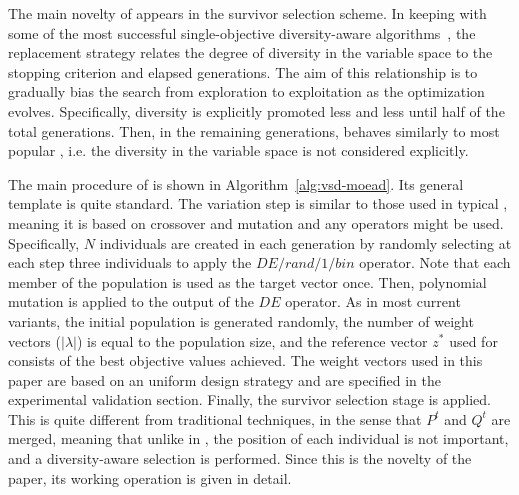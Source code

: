 The main novelty of \AVSDMOEAD{} appears in the survivor selection scheme.
%
In keeping with some of the most successful single-objective diversity-aware algorithms~\cite{segura2016improving}, the 
replacement strategy relates the degree of diversity in the variable space to the stopping criterion
and elapsed generations.
%
The aim of this relationship is to gradually bias the search from exploration to exploitation as the
optimization evolves.
%
Specifically, diversity is explicitly promoted less and less until half of the total generations. 
%
Then, in the remaining generations, \AVSDMOEAD{} behaves similarly to most popular
\MOEAS{}, i.e. the diversity in the variable space is not considered explicitly.

The main procedure of \AVSDMOEAD{} is shown in Algorithm~\ref{alg:vsd-moead}.
%
Its general template is quite standard.
%
The variation step is similar to those used in typical \MOEAS{}, meaning
it is based on crossover and mutation and any operators might be used.
%
Specifically, $N$ individuals are created in each generation by randomly selecting at each step three individuals
to apply the $DE/rand/1/bin$ operator.
%
Note that each member of the population is used as the target vector once.
%
Then, polynomial mutation is applied to the output of the $DE$ operator.
%
As in most current \MOEAD{} variants, the initial population is generated randomly,
the number of weight vectors ($|\lambda|$) is equal to the population size,
and the reference vector $z^*$ used for \ASF{} consists of the best 
objective values achieved.
%
The weight vectors used in this paper are based on an uniform design strategy and are
specified in the experimental validation section.
%
Finally, the survivor selection stage is applied.
%
This is quite different from traditional techniques, in the sense that $P^t$ and $Q^t$ are merged, meaning
that unlike in \MOEAD{}, the position of each individual is not important, and a diversity-aware
selection is performed.
%
Since this is the novelty of the paper, its working operation is given in detail.

